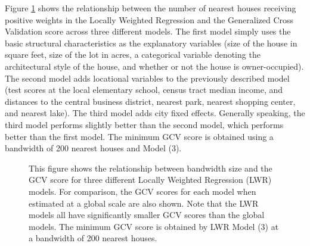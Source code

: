 \documentclass{article}\usepackage{graphicx, color}
\begin{document}
Figure \ref{fig:GCVmodel} shows the relationship between the number of nearest houses receiving positive weights in the Locally Weighted Regression and the Generalized Cross Validation score across three different models. The first model simply uses the basic structural characteristics as the explanatory variables (size of the house in square feet, size of the lot in acres, a categorical variable denoting the architectural style of the house, and whether or not the house is owner-occupied). The second model adds locational variables to the previously described model (test scores at the local elementary school, census tract median income, and distances to the central business district, nearest park, nearest shopping center, and nearest lake). The third model adds city fixed effects. Generally speaking, the third model performs slightly better than the second model, which performs better than the first model. The minimum GCV score is obtained using a bandwidth of 200 nearest houses and Model (3).
\begin{figure}
\caption{This figure shows the relationship between bandwidth size and the GCV score for three different Locally Weighted Regression (LWR) models. For comparison, the GCV scores for each model when estimated at a global scale are also shown. Note that the LWR models all have significantly smaller GCV scores than the global models. The minimum GCV score is obtained by LWR Model (3) at a bandwidth of 200 nearest houses.}\label{fig:GCVmodel}
\end{figure}
\end{document}
